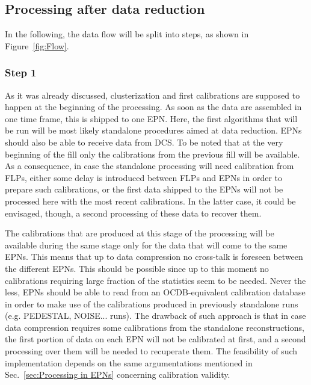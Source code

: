 \subsection{Processing after data reduction}
\label{sec:Processing after data reduction}
In the following, the data flow will be split into steps, as shown in Figure~\ref{fig:Flow}. 

\subsubsection{Step 1}
\label{sec:Step 1}
As it was already discussed, 
clusterization and first 
calibrations are supposed to happen at the beginning of the processing. As soon as the data are assembled in 
one time frame, this is shipped to one EPN. Here, the first algorithms that will be run will be most likely standalone
procedures aimed at data reduction. EPNs should also be able to receive data from DCS. To be noted that at the
very beginning of the fill only the calibrations from the previous fill will be available. As a consequence, in case the 
standalone processing will need calibration from FLPs, either some delay is introduced between FLPs and EPNs
in order to prepare such calibrations, or the first data shipped to the EPNs will not be processed here with the most 
recent calibrations. In the latter case, it could be envisaged, though, a second processing of these data to recover 
them.

The calibrations that are produced at this stage of the processing will be available during the same stage only for the 
data that will come to the same EPNs. This means that up to data compression no cross-talk is foreseen between the
different EPNs. This should be possible since up to this moment no calibrations requiring large fraction of the statistics
seem to be needed. Never the less, EPNs should be able to read from an OCDB-equivalent calibration database 
in order to make use of the calibrations produced in previously standalone runs (e.g. PEDESTAL, NOISE... runs). The 
drawback of such approach is that in case data compression requires some calibrations from the standalone reconstructions,
the first portion of data on each EPN will not be calibrated at first, and a second processing over them will be needed
to recuperate them. The feasibility of such implementation depends on the same argumentations mentioned in 
Sec.~\ref{sec:Processing in EPNs} concerning calibration validity. 

